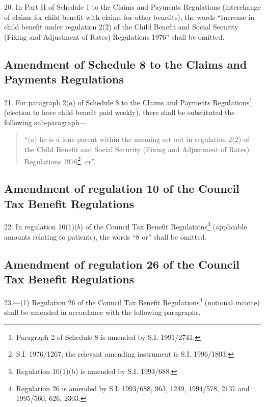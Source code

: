 \documentclass[a4paper]{article}
\begin{document}
20.  In Part II of Schedule 1 to the Claims and Payments Regulations (interchange of claims for child benefit with claims for other benefits), the words “Increase in child benefit under regulation 2(2) of the Child Benefit and Social Security (Fixing and Adjustment of Rates) Regulations 1976” shall be omitted.

\subsection[21. Amendment of Schedule 8 to the Claims and Payments Regulations]{Amendment of Schedule 8 to the Claims and Payments Regulations}

21.  For paragraph 2($a$) of Schedule 8 to the Claims and Payments Regulations\footnote{\frenchspacing Paragraph 2 of Schedule 8 is amended by S.I. 1991/2741.} (election to have child benefit paid weekly), there shall be substituted the following sub-paragraph—
\begin{quotation}
“($a$) he is a lone parent within the meaning set out in regulation 2(2) of the Child Benefit and Social Security (Fixing and Adjustment of Rates) Regulations 1976\footnote{\frenchspacing S.I. 1976/1267; the relevant amending instrument is S.I. 1996/1803.}, or”.
\end{quotation}

\subsection[22. Amendment of regulation 10 of the Council Tax Benefit Regulations]{Amendment of regulation 10 of the Council Tax Benefit Regulations}

22.  In regulation 10(1)($b$) of the Council Tax Benefit Regulations\footnote{\frenchspacing Regulation 10(1)(b) is amended by S.I. 1993/688.} (applicable amounts relating to patients), the words “8 or” shall be omitted.

\subsection[23. Amendment of regulation 26 of the Council Tax Benefit Regulations]{Amendment of regulation 26 of the Council Tax Benefit Regulations}

23.—(1) Regulation 26 of the Council Tax Benefit Regulations\footnote{\frenchspacing Regulation 26 is amended by S.I. 1993/688, 963, 1249, 1994/578, 2137 and 1995/560, 626, 2303.} (notional income) shall be amended in accordance with the following paragraphs.
\end{document}
